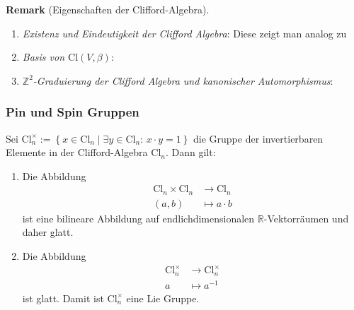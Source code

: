 \documentclass[10pt, letterpaper]{article}
\newcommand{\R}{\mathbb{R}}
\newcommand{\Z}{\mathbb{Z}}
\newcommand{\Cl}{\mathrm{Cl}}
\newcommand{\CustomHeading}[3]{%
  \par\medskip\noindent%
  \textbf{#1 #2} \textnormal{(#3)}.\enskip%
}
\newenvironment{REM}[2]{\CustomHeading{Remark}{#1}{#2}}{}
\begin{document}
\begin{REM}{}{Eigenschaften der Clifford-Algebra}
\begin{enumerate}
  \item \emph{Existenz und Eindeutigkeit der Clifford Algebra}: Diese zeigt man analog zu 
  \item \emph{Basis von $\Cl(V,\beta)$}:
  \item \emph{$\Z^2$-Graduierung der Clifford Algebra und kanonischer Automorphismus}:
\end{enumerate}
\end{REM}






\subsubsection{Pin und Spin Gruppen}

Sei $\mathrm{Cl}_n^{\times}:=\left\{x \in \mathrm{Cl}_n \mid \exists y \in \mathrm{Cl}_n\right.$: $\left.x \cdot y=1\right\}$ die Gruppe der invertierbaren Elemente in der Clifford-Algebra $\mathrm{Cl}_n$. Dann gilt:
\begin{enumerate}
  \item Die Abbildung
  $$
  \begin{aligned}
  \mathrm{Cl}_n \times \mathrm{Cl}_n & \rightarrow \mathrm{Cl}_n \\
  (a, b) & \mapsto a \cdot b
  \end{aligned}
  $$
  ist eine bilineare Abbildung auf endlichdimensionalen $\R$-Vektorräumen und daher glatt.
  \item Die Abbildung
  $$
  \begin{aligned}
  \mathrm{Cl}_n^{\times} & \rightarrow \mathrm{Cl}_n^{\times} \\
  a & \mapsto a^{-1}
  \end{aligned}
  $$
  ist glatt. Damit ist $\mathrm{Cl}_n^{\times}$ eine Lie Gruppe.
  
\end{enumerate}
\end{document}
